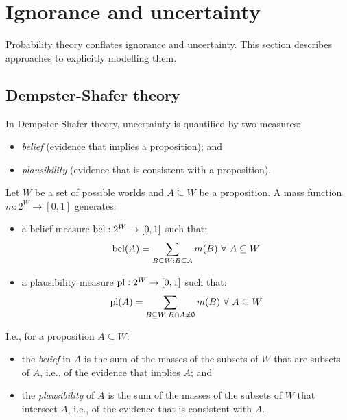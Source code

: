 \section{Ignorance and uncertainty}

Probability theory conflates ignorance and uncertainty.
This section describes approaches to explicitly modelling them.

\subsection{Dempster-Shafer theory}

In Dempster-Shafer theory, uncertainty is quantified by two measures:

\begin{itemize}
  \item \textit{belief} (evidence that implies a proposition); and
  \item \textit{plausibility} (evidence that is consistent with a proposition).
\end{itemize}

\begin{dfn}
  \label{def:4:BeliefPlausibility}
  Let $W$ be a set of possible worlds and $A \subseteq W$ be a proposition.
  A mass function $m : 2^W \rightarrow [0, 1]$ generates:
  \begin{itemize}
    \item a belief measure $\operatorname*{bel} : 2^W \rightarrow [0, 1]$ such that:
          \begin{equation}
            \label{eqn:4:Belief}
            \operatorname*{bel}(A) =
            \sum_{B \subseteq W : B \subseteq A} m(B)
            \ \forall\
            A \subseteq W
          \end{equation}
    \item a plausibility measure $\operatorname*{pl} : 2^W \rightarrow [0, 1]$ such that:
          \begin{equation}
            \label{eqn:4:Plausibility}
            \operatorname*{pl}(A) =
            \sum_{B \subseteq W : B \cap A \neq \emptyset} m(B)
            \ \forall\
            A \subseteq W
          \end{equation}
  \end{itemize}
\end{dfn}

I.e., for a proposition $A \subseteq W$:

\begin{itemize}
  \item the \textit{belief} in $A$ is the sum of the masses of the subsets of
        $W$ that are subsets of $A$, i.e., of the evidence that implies $A$; and
  \item the \textit{plausibility} of $A$ is the sum of the masses of the subsets
        of $W$ that intersect $A$, i.e., of the evidence that is consistent with
        $A$.
\end{itemize}

